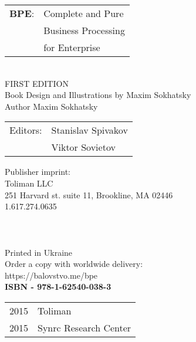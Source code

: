 \begingroup
{}
\parindent 0pt
\parskip
\baselineskip

\begin{tabular}{ll}
{\bf BPE}: & Complete and Pure \\
    & Business Processing \\
    & for Enterprise \\
\end{tabular}
\\

FIRST EDITION \\

Book Design and Illustrations by Maxim Sokhatsky \\
Author Maxim Sokhatsky \\

\begin{tabular}{ll}
Editors: & Stanislav Spivakov \\
         & Viktor Sovietov \\
\end{tabular}

Publisher imprint: \\
Toliman LLC \\
251 Harvard st. suite 11, Brookline, MA 02446 \\
1.617.274.0635 \\
\\
\\
\\



Printed in Ukraine \\

Order a copy with worldwide delivery: \\
https://balovstvo.me/bpe \\

{\bf  ISBN - 978-1-62540-038-3\hspace{2em}}

\begin{tabular}{ll}
\textcopyright{} 2015 & Toliman \\
\textcopyright{} 2015 & Synrc Research Center
\end{tabular}

\endgroup

   \thispagestyle{empty}
